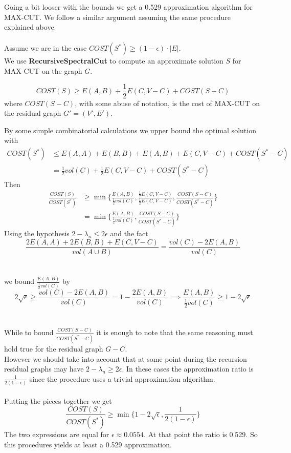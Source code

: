 Going a bit looser with the bounds we get a 0.529 approximation algorithm for MAX-CUT. We follow a similar argument assuming the same procedure explained above.
\\
\\
Assume we are in the case $ COST(S^*) \geq (1-\epsilon)\cdot |E|$.\\
We use \textbf{RecursiveSpectralCut} to compute an approximate solution $ S $ for MAX-CUT on the graph $ G $.

\[ COST(S) \geq E(A,B) + \frac{1}{2}E(C,V-C) + COST(S-C) \]
where $ COST(S-C) $, with some abuse of notation, is the cost of MAX-CUT on the residual graph $ G'=(V',E') $.

By some simple combinatorial calculations we upper bound the optimal solution with
\begin{align*}
COST(S^*) &\leq E(A,A) + E(B,B) + E(A,B) + E(C,V-C) + COST(S^*-C)\\
& = \frac{1}{2} vol(C) + \frac{1}{2}E(C,V-C) + COST(S^*-C)
\end{align*}
Then 
\begin{align*}
\frac{COST(S)}{COST(S^*)} & \geq \min \bigg\{ \frac{E(A,B)}{\frac{1}{2}vol(C)}
	                              , \frac{\frac{1}{2}E(C,V-C)}{\frac{1}{2}E(C,V-C)}
	                              , \frac{COST(S-C)}{COST(S^*-C)}\bigg\}\\
&=\min \bigg\{ \frac{E(A,B)}{\frac{1}{2}vol(C)}
             , \frac{COST(S-C)}{COST(S^*-C)}\bigg\}
\end{align*}
Using the hypothesis $2-\lambda_n \leq 2\epsilon $ and the fact
\[ \frac{2E(A,A) + 2E(B,B) + E(C, V - C)}{vol(A \cup B)} = \frac{vol(C)-2E(A,B)}{vol(C)} \]
\\
\\
we bound $ \frac{E(A,B)}{\frac{1}{2}vol(C)} $ by
\[ 2 \sqrt{\epsilon} \geq \frac{vol(C)-2E(A,B)}{vol(C)} = 1 - \frac{2E(A,B)}{vol(C)} \implies \frac{E(A,B)}{\frac{1}{2}vol(C)} \geq 1-2\sqrt{\epsilon} \]
\\
\\
While to bound $  \frac{COST(S-C)}{COST(S^*-C)} $ it is enough to note that the same reasoning must hold true for the residual graph $ G-C $.\\
However we should take into account that at some point during the recursion residual graphs may have $ 2-\lambda_n \geq 2\epsilon $. In these cases the approximation ratio is $ \frac{1}{2(1-\epsilon)} $ since the procedure uses a trivial approximation algorithm.
\\
\\
Putting the pieces together we get
\[\frac{COST(S)}{COST(S^*)} \geq \min \bigg\{ 1-2\sqrt{\epsilon}, \frac{1}{2(1-\epsilon)} \bigg\}\]
The two expressions are equal for $ \epsilon \approx 0.0554 $. At that point the ratio is 0.529. So this procedures yields at least a 0.529 approximation.


